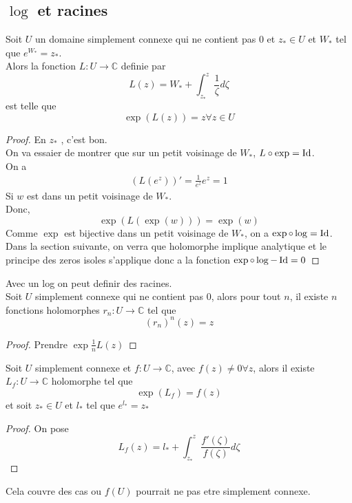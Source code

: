 \documentclass[../main.tex]{subfiles}
\begin{document}
\subsection{$\log$ et racines}
\begin{propo}
Soit $U$ un domaine simplement connexe qui ne contient pas 0 et $z_*\in U$ et $W_*$ tel que $ e^{W_*} = z_*$.\\
Alors la fonction $L: U \to \mathbb{C}$ definie par
\[ 
	L( z) = W_* + \int_{ z_* }^{ z }\frac{1}{\zeta}d\zeta
\]
est telle que
\[ 
	\exp( L( z) ) =z\forall z \in U
\]

\end{propo}
\begin{proof}
En $z_*$ , c'est bon.\\
On va essaier de montrer que sur un petit voisinage de $W_*$, $L\circ\exp=\operatorname{Id}$.\\
On a 
\begin{align*}
	( L( e^{z}) )' = \frac{1}{e^{z}}e^{z}=1
\end{align*}
Si $w$ est dans un petit voisinage de $W_*$.\\
Donc,
\[ 
	\exp( L( \exp( w) ) ) = \exp ( w) 
\]
Comme $\exp$ est bijective dans un petit voisinage de $W_*$, on a $\exp\circ\log=\operatorname{Id}$.\\
Dans la section suivante, on verra que holomorphe implique analytique et le principe des zeros isoles s'applique donc a la fonction $\exp\circ\log-\operatorname{Id}=0$ 
\end{proof}
Avec un log on peut definir des racines.\\
Soit $U$ simplement connexe qui ne contient pas 0, alors pour tout $n$, il existe $n$ fonctions holomorphes $r_n: U\to \mathbb{C}$ tel que
\[ 
	( r_n)^{n}( z) =z
\]
\begin{proof}
	Prendre $\exp \frac{1}{n}L( z) $ 
\end{proof}
\begin{propo}
	Soit $U$ simplement connexe et $f:U\to \mathbb{C}$, avec $f( z) \neq 0 \forall z $, alors il existe $ L_f: U \to \mathbb{C}$ holomorphe tel que
	\[ 
		\exp( L_f ) 	= f( z) 
	\]
	et soit $z_*\in U$ et $l_*$ tel que $ e^{l_*} =z_*$ 
	
\end{propo}
\begin{proof}
On pose 
\[ 
	L_f( z) = l_* + \int_{ z_* }^{ z } \frac{f'( \zeta) }{f( \zeta) }d\zeta
\]
	
\end{proof}
\begin{rmq}
	Cela couvre des cas ou $f( U) $ pourrait ne pas etre simplement connexe.
\end{rmq}


	
\end{document}
